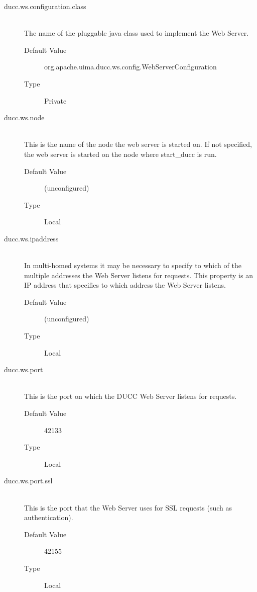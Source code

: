     \begin{description}
        \item[ducc.ws.configuration.class] \hfill \\
          The name of the pluggable java class used to implement the Web Server. 
          \begin{description}
            \item[Default Value] org.apache.uima.ducc.ws.config.WebServerConfiguration 
            \item[Type] Private 
          \end{description}
        
        \item[ducc.ws.node] \hfill \\
          This is the name of the node the web server is started on. If not specified, the web server is 
          started on the node where start\_ducc is run. 
          \begin{description}
            \item[Default Value] (unconfigured) 
            \item[Type] Local 
          \end{description}
            

        \item[ducc.ws.ipaddress] \hfill \\
          In multi-homed systems it may be necessary to specify to which of the multiple addresses 
          the Web Server listens for requests. This property is an IP address that specifies to which 
          address the Web Server listens. 
          \begin{description}
            \item[Default Value] (unconfigured) 
            \item[Type] Local 
          \end{description}
              
        \item[ducc.ws.port] \hfill \\
          This is the port on which the DUCC Web Server listens for requests. 
          \begin{description}
            \item[Default Value] 42133 
            \item[Type] Local 
          \end{description}

        \item[ducc.ws.port.ssl] \hfill \\
          This is the port that the Web Server uses for SSL requests (such as authentication). 
          \begin{description}
            \item[Default Value] 42155 
            \item[Type] Local 
          \end{description}


\end{description}
